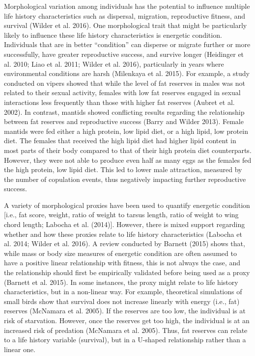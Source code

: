 \documentclass[
]{article}
\begin{document}
Morphological variation among individuals has the potential to influence
multiple life history characteristics such as dispersal, migration,
reproductive fitness, and survival (Wilder et al. 2016). One
morphological trait that might be particularly likely to influence these
life history characteristics is energetic condition. Individuals that
are in better ``condition'' can disperse or migrate further or more
successfully, have greater reproductive success, and survive longer
(Heidinger et al. 2010; Liao et al. 2011; Wilder et al. 2016),
particularly in years where environmental conditions are harsh
(Milenkaya et al. 2015). For example, a study conducted on vipers showed
that while the level of fat reserves in males was not related to their
sexual activity, females with low fat reserves engaged in sexual
interactions less frequently than those with higher fat reserves (Aubret
et al. 2002). In contrast, mantids showed conflicting results regarding
the relationship between fat reserves and reproductive success (Barry
and Wilder 2013). Female mantids were fed either a high protein, low
lipid diet, or a high lipid, low protein diet. The females that received
the high lipid diet had higher lipid content in most parts of their body
compared to that of their high protein diet counterparts. However, they
were not able to produce even half as many eggs as the females fed the
high protein, low lipid diet. This led to lower male attraction,
measured by the number of copulation events, thus negatively impacting
further reproductive success.

A variety of morphological proxies have been used to quantify energetic
condition {[}i.e., fat score, weight, ratio of weight to tarsus length,
ratio of weight to wing chord length; Labocha et al. (2014){]}. However,
there is mixed support regarding whether and how these proxies relate to
life history characteristics (Labocha et al. 2014; Wilder et al. 2016).
A review conducted by Barnett (2015) shows that, while mass or body size
measures of energetic condition are often assumed to have a positive
linear relationship with fitness, this is not always the case, and the
relationship should first be empirically validated before being used as
a proxy (Barnett et al. 2015). In some instances, the proxy might relate
to life history characteristics, but in a non-linear way. For example,
theoretical simulations of small birds show that survival does not
increase linearly with energy (i.e., fat) reserves (McNamara et al.
2005). If the reserves are too low, the individual is at risk of
starvation. However, once the reserves get too high, the individual is
at an increased risk of predation (McNamara et al. 2005). Thus, fat
reserves can relate to a life history variable (survival), but in a
U-shaped relationship rather than a linear one.
\end{document}
